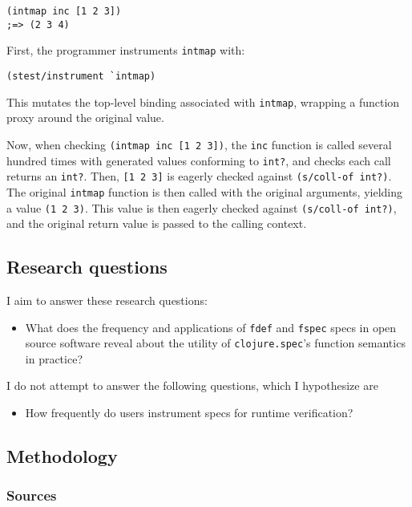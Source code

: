 \begin{verbatim}
(intmap inc [1 2 3])
;=> (2 3 4)
\end{verbatim}

First, the programmer instruments \texttt{intmap} with:

\begin{verbatim}
(stest/instrument `intmap)
\end{verbatim}

This mutates the top-level binding associated with \texttt{intmap}, wrapping a function
proxy around the original value.

Now, when checking \texttt{(intmap inc [1 2 3])}, the \texttt{inc} function is
called several hundred times with generated values conforming to \texttt{int?},
and checks each call returns an \texttt{int?}.
Then, \texttt{[1 2 3]} is eagerly checked against \texttt{(s/coll-of int?)}.
The original \texttt{intmap} function is then called with the original arguments,
yielding a value \texttt{(1 2 3)}. This value is then eagerly checked against
\texttt{(s/coll-of int?)}, and the original return value is passed to the calling
context.

\subsection{Research questions}

I aim to answer these research questions:

\begin{itemize}
  \item What does the frequency and applications of \texttt{fdef} and \texttt{fspec} specs
    in open source software reveal about the utility of \texttt{clojure.spec}'s
    function semantics in practice?
\end{itemize}

I do not attempt to answer the following questions, which I hypothesize are

\begin{itemize}
  \item How frequently do users instrument specs for runtime verification?
\end{itemize}

\subsection{Methodology}

\subsubsection{Sources}


